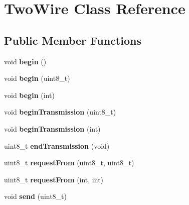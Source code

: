 \hypertarget{class_two_wire}{}\section{Two\+Wire Class Reference}
\label{class_two_wire}
\subsection*{Public Member Functions}
\begin{DoxyCompactItemize}
\item 
void {\bfseries begin} ()\hypertarget{class_two_wire_ada85a7a8663ec8af0a1248b659be2f18}{}\label{class_two_wire_ada85a7a8663ec8af0a1248b659be2f18}

\item 
void {\bfseries begin} (uint8\+\_\+t)\hypertarget{class_two_wire_a28bca087ed188781ef15e72622d3b1fb}{}\label{class_two_wire_a28bca087ed188781ef15e72622d3b1fb}

\item 
void {\bfseries begin} (int)\hypertarget{class_two_wire_a2806aa5684d36d7d20bf7c51cab3e602}{}\label{class_two_wire_a2806aa5684d36d7d20bf7c51cab3e602}

\item 
void {\bfseries begin\+Transmission} (uint8\+\_\+t)\hypertarget{class_two_wire_a8d55f00ea8ac3d7427d62e0c71e95ec2}{}\label{class_two_wire_a8d55f00ea8ac3d7427d62e0c71e95ec2}

\item 
void {\bfseries begin\+Transmission} (int)\hypertarget{class_two_wire_a4da95eb4adced5dad152344243e57aad}{}\label{class_two_wire_a4da95eb4adced5dad152344243e57aad}

\item 
uint8\+\_\+t {\bfseries end\+Transmission} (void)\hypertarget{class_two_wire_af80f9a7b85a3a81a035ca94c95bcdc1d}{}\label{class_two_wire_af80f9a7b85a3a81a035ca94c95bcdc1d}

\item 
uint8\+\_\+t {\bfseries request\+From} (uint8\+\_\+t, uint8\+\_\+t)\hypertarget{class_two_wire_ae27d0936487551a05a1e9901bc456599}{}\label{class_two_wire_ae27d0936487551a05a1e9901bc456599}

\item 
uint8\+\_\+t {\bfseries request\+From} (int, int)\hypertarget{class_two_wire_ad40a27213d0bb32f7b819aa8962fccd3}{}\label{class_two_wire_ad40a27213d0bb32f7b819aa8962fccd3}

\item 
void {\bfseries send} (uint8\+\_\+t)\hypertarget{class_two_wire_abf1f8c96f02a03e299e65cea8ec4a3a8}{}\label{class_two_wire_abf1f8c96f02a03e299e65cea8ec4a3a8}


\end{DoxyCompactItemize}
